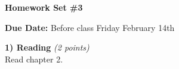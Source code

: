 

\def\xyprime{\ensuremath{\begin{pmatrix} x' \\ y' \end{pmatrix}}}



\thispagestyle{fancy}






\begin{center}
{\huge \textbf{Homework Set \#3}}
\large

{\textbf{ Due Date:} Before class Friday February 14th  }
\end{center}

\textbf{1) Reading } \hfill \textit{(2 points)}\\
Read chapter 2.

\vspace*{0.25in}


